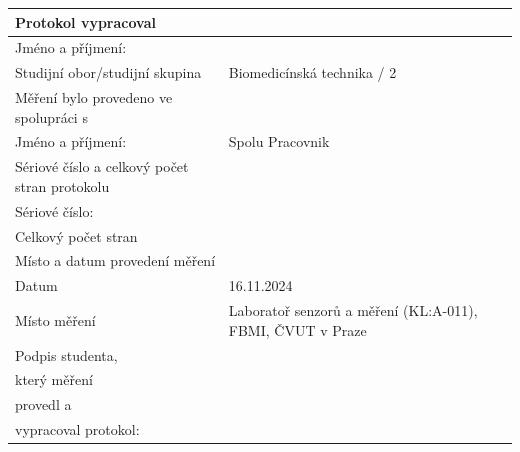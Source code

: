 \documentclass{article}
\begin{document}
	\begin{table}[h]
		\centering
		\begin{tabular}{p{6cm} p{4cm}}
			\hline
			\multicolumn{2}{|l|}{Protokol vypracoval}                                                                                                   \\ \hline
			\multicolumn{1}{|l|}{Jméno a příjmení:}               & \multicolumn{1}{l|}{\autor}                                    \\ \hline
			\multicolumn{1}{|l|}{Studijní obor/studijní skupina}        & \multicolumn{1}{l|}{Biomedicínská technika / 2}                        \\ \hline
			\multicolumn{1}{|l}{Měření bylo provedeno ve spolupráci s}     & \multicolumn{1}{l|}{}                                                  \\ \hline
			\multicolumn{1}{|l|}{Jméno a příjmení:}               & \multicolumn{1}{l|}{Spolu Pracovnik}                        \\ \hline
			\multicolumn{1}{|l}{Sériové číslo a celkový počet stran protokolu} & \multicolumn{1}{l|}{}                                                  \\ \hline
			\multicolumn{1}{|l|}{Sériové číslo:}                & \multicolumn{1}{l|}{\SC}  \\ \hline
			\multicolumn{1}{|l|}{Celkový počet stran}              & \multicolumn{1}{l|}{\pageref{LastPage}}                                                  \\ \hline
			\multicolumn{2}{|l|}{Místo a datum provedení měření}                                                                                        \\ \hline
			\multicolumn{1}{|l|}{Datum}                     & \multicolumn{1}{l|}{16.11.2024}                                          \\ \hline
			\multicolumn{1}{|l|}{Místo měření}                 & \multicolumn{1}{l|}{Laboratoř senzorů a měření (KL:A-011), FBMI, ČVUT v Praze} \\ \hline
			\multicolumn{1}{|l|}{Podpis studenta,}               & \multicolumn{1}{l|}{}                                                  \\
			\multicolumn{1}{|l|}{který měření}                 & \multicolumn{1}{l|}{}                                                  \\
			\multicolumn{1}{|l|}{provedl a}                   & \multicolumn{1}{l|}{}                                                  \\
			\multicolumn{1}{|l|}{vypracoval protokol:}             & \multicolumn{1}{l|}{}                                                  \\ \hline
		\end{tabular}
	\end{table}
\end{document}

